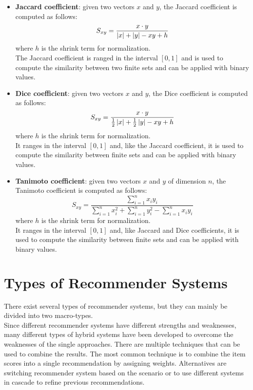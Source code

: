 \begin{itemize}
\item \textbf{Jaccard coefficient}: given two vectors $x$ and $y$, the Jaccard coefficient is computed as follows:
\begin{equation*}
S_{xy} = \frac{x \cdot y}{\left\lvert x\right\rvert + \left\lvert y\right\rvert - xy + h}
\end{equation*}
where $h$ is the shrink term for normalization.\\
The Jaccard coefficient is ranged in the interval $[0, 1]$ and is used to compute the similarity between two finite sets and can be applied with binary values.
\item \textbf{Dice coefficient}: given two vectors $x$ and $y$, the Dice coefficient is computed as follows:
\begin{equation*}
S_{xy} = \frac{x \cdot y}{\frac{1}{2}\left\lvert x\right\rvert + \frac{1}{2}\left\lvert y\right\rvert - xy + h}
\end{equation*}
where $h$ is the shrink term for normalization.\\
It ranges in the interval $[0, 1]$ and, like the Jaccard coefficient, it is used to compute the similarity between finite sets and can be applied with binary values.
\item \textbf{Tanimoto coefficient}: given two vectors $x$ and $y$ of dimension $n$, the Tanimoto coefficient is computed as follows:
\begin{equation*}
S_{xy} = \frac{\sum_{i = 1}^{n} x_iy_i}{\sum_{i = 1}^{n} x_i^2 + \sum_{i = 1}^{n} y_i^2 - \sum_{i = 1}^{n} x_iy_i}
\end{equation*}
where $h$ is the shrink term for normalization.\\
It ranges in the interval $[0, 1]$ and, like Jaccard and Dice coefficients, it is used to compute the similarity between finite sets and can be applied with binary values.
\end{itemize}



\section{Types of Recommender Systems}

There exist several types of recommender systems, but they can mainly be divided into two macro-types.\\
Since different recommender systems have different strengths and weaknesses, many different types of hybrid systems have been developed to overcome the weaknesses of the single approaches. There are multiple techniques that can be used to combine the results. The most common technique is to combine the item scores into a single recommendation by assigning weights. Alternatives are switching recommender system based on the scenario or to use different systems in cascade to refine previous recommendations.


